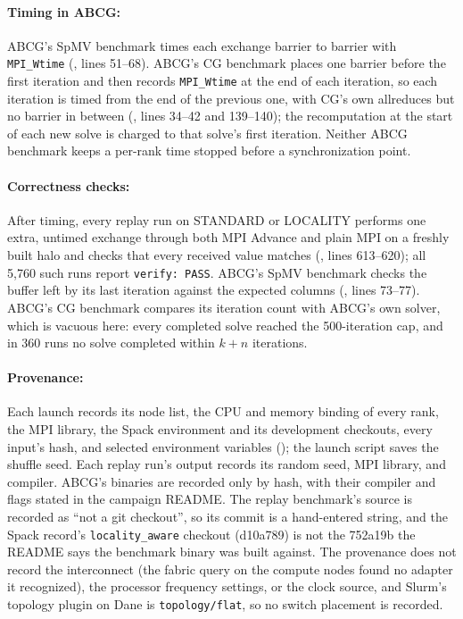 \documentclass[11pt]{article}
\begin{document}
\paragraph{Timing in ABCG:} ABCG's SpMV benchmark times each exchange barrier to barrier
with \texttt{MPI\_Wtime} (, lines 51--68). ABCG's
CG benchmark places one barrier before the first iteration and then records
\texttt{MPI\_Wtime} at the end of each iteration, so each iteration is timed from the end
of the previous one, with CG's own allreduces but no barrier in between
(, lines 34--42 and 139--140); the
recomputation at the start of each new solve is charged to that solve's first iteration.
Neither ABCG benchmark keeps a per-rank time stopped before a synchronization point.

\paragraph{Correctness checks:} After timing, every replay run on STANDARD or LOCALITY
performs one extra, untimed exchange through both MPI Advance and plain MPI on a freshly
built halo and checks that every received value matches (,
lines 613--620); all 5,760 such runs report \texttt{verify: PASS}. ABCG's SpMV benchmark
checks the buffer left by its last iteration against the expected columns
(, lines 73--77). ABCG's CG benchmark compares its
iteration count with ABCG's own solver, which is vacuous here: every completed solve
reached the 500-iteration cap, and in 360 runs no solve completed within $k+n$
iterations.

\paragraph{Provenance:} Each launch records its node list, the CPU and memory binding of
every rank, the MPI library, the Spack environment and its development checkouts, every
input's hash, and selected environment variables (); the
launch script saves the shuffle seed. Each replay run's output records its random seed,
MPI library, and compiler. ABCG's binaries are recorded only by hash, with their
compiler and flags stated in the campaign README. The replay benchmark's source is
recorded as ``not a git checkout'', so its commit is a hand-entered string, and the Spack
record's \texttt{locality\_aware} checkout (d10a789) is not the 752a19b the README says
the benchmark binary was built against. The provenance does not record the interconnect
(the fabric query on the compute nodes found no adapter it recognized), the processor
frequency settings, or the clock source, and Slurm's topology plugin on Dane is
\texttt{topology/flat}, so no switch placement is recorded.
\end{document}
